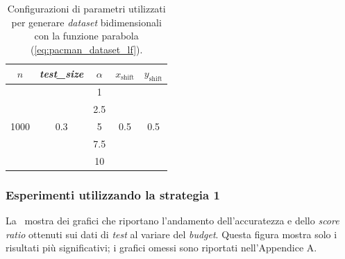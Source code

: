 \begin{table}
    \centering
    \begin{tabular}{ccccc}
        \toprule
         $n$ & \emph{test\_size} &$\alpha$ & $x_\text{shift}$ & $y_\text{shift}$ \\
        \midrule
        \multirow{5}{*}{1000} & \multirow{5}{*}{0.3} &1   & \multirow{5}{*}{0.5} & \multirow{5}{*}{0.5} \\
        && 2.5 &\\
        && 5   &\\
        && 7.5 &\\
        && 10  &\\
        \bottomrule
    \end{tabular}
    \caption{Configurazioni di parametri utilizzati per generare \emph{dataset} bidimensionali con la funzione parabola (\ref{eq:pacman_dataset_lf}).}
    \label{tab:parametri_ds_pacman}
\end{table}

\subsubsection{Esperimenti utilizzando la strategia 1}
La~ mostra dei grafici che riportano l'andamento dell'accuratezza e dello \emph{score ratio} ottenuti sui dati di \emph{test} al variare del \emph{budget}.
Questa figura mostra solo i risultati più significativi; i grafici omessi sono riportati nell'Appendice A.

